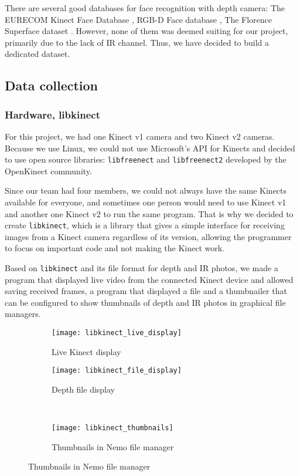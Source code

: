     There are several good databases for face recognition with depth camera:
    The EURECOM Kinect Face Database \cite{eurecom},
    RGB-D Face database \cite{vapaaudk},
    The Florence Superface dataset \cite{superface}. However, none of them was
    deemed suiting for our project, primarily due to the lack of IR channel.
    Thus, we have decided to build a dedicated dataset.

    \subsection*{Data collection}

    \subsubsection*{Hardware, libkinect}
    For this project, we had one Kinect v1 camera and two Kinect v2 cameras.
    Because we use Linux, we could not use Microsoft's API for Kinects and decided to
    use open source libraries: \texttt{libfreenect} \cite{libfreenect}
    and \texttt{libfreenect2} \cite{libfreenect2} developed by the OpenKinect community.

    Since our team had four members, we could not always have the same Kinects available
    for everyone, and sometimes one person would need to use Kinect v1 and another one
    Kinect v2 to run the same program.
    That is why we decided to create \texttt{libkinect}, which is a library that
    gives a simple interface for receiving images from a Kinect camera
    regardless of its version, allowing the programmer to focus on important code
    and not making the Kinect work.

    Based on \texttt{libkinect} and its file format for depth and IR photos,
    we made a program that displayed live video from the connected Kinect device
    and allowed saving received frames, a program that displayed a file
    and a thumbnailer that can be configured to show thumbnails of depth and IR photos
    in graphical file managers.

    \begin{figure}[H]
        \centering
        \caption{Screenshots of implemented tools}
        \begin{subfigure}[b]{0.49\textwidth}
            \caption{Live Kinect display}
            \centering
            \texttt{[image: libkinect\_live\_display]}
        \end{subfigure}
        \begin{subfigure}[b]{0.49\textwidth}
            \caption{Depth file display}
            \centering
            \texttt{[image: libkinect\_file\_display]}
        \end{subfigure}\\
        \vspace{3mm}
        \begin{subfigure}[b]{0.6\textwidth}
            \caption{Thumbnails in Nemo file manager}
            \centering
            \texttt{[image: libkinect\_thumbnails]}
        \end{subfigure}
        \label{fig:libkinect_screenshots}
    \end{figure}

